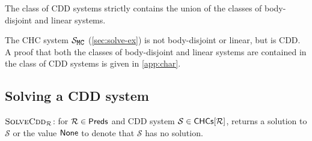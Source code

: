 \begin{thm}
	\label{thm:cdd-contains}
  The class of CDD systems strictly contains the union of the classes
  of body-disjoint and linear systems.
\end{thm}
%
The CHC system $\mcchc$ (\autoref{sec:solve-ex}) is not body-disjoint
or linear, but is CDD.
%
A proof that both the classes of body-disjoint and linear systems are
contained in the class of CDD systems is given in \autoref{app:char}.

\subsection{Solving a CDD system}
\label{sec:solve-cdd}

\begin{algorithm}[t]
  \caption{$\textsc{SolveCdd}_{ \mathcal{R} }$: for $\mathcal{R} \in \mathsf{Preds}$
    and CDD system $\mathcal{S} \in \mathsf{CHCs}[  \mathcal{R}  ]$, returns a
    solution to $\mathcal{S}$ or the value $\mathsf{None}$ to denote that
    $\mathcal{S}$ has no solution.}
  \label{alg:solve-cdd}
\end{algorithm}
